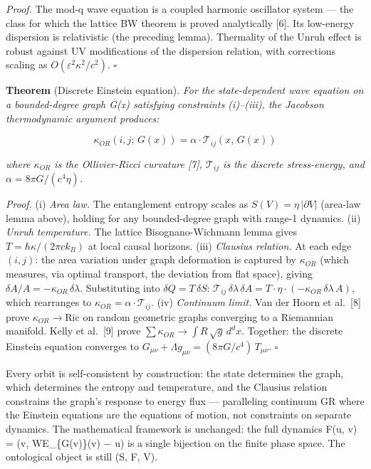 \documentclass[
]{article}
\begin{document}
\emph{Proof.} The mod-q wave equation is a coupled harmonic oscillator
system --- the class for which the lattice BW theorem is proved
analytically {[}6{]}. Its low-energy dispersion is relativistic (the
preceding lemma). Thermality of the Unruh effect is robust against UV
modifications of the dispersion relation, with corrections scaling as
\(O(\varepsilon^2\kappa^2/c^2)\). \(\square\)

\textbf{Theorem} (Discrete Einstein equation). \emph{For the
state-dependent wave equation on a bounded-degree graph G(x) satisfying
constraints (i)--(iii), the Jacobson thermodynamic argument produces:}

\[\kappa_{OR}(i, j;\, G(x)) = \alpha \cdot \mathcal{T}_{ij}(x,\, G(x))\]

\emph{where \(\kappa_{OR}\) is the Ollivier-Ricci curvature {[}7{]},
\(\mathcal{T}_{ij}\) is the discrete stress-energy, and
\(\alpha = 8\pi G/(c^4 \eta)\).}

\emph{Proof.} (i) \emph{Area law.} The entanglement entropy scales as
\(S(V) = \eta\,|\partial V|\) (area-law lemma above), holding for any
bounded-degree graph with range-1 dynamics. (ii) \emph{Unruh
temperature.} The lattice Bisognano-Wichmann lemma gives
\(T = \hbar\kappa/(2\pi c k_B)\) at local causal horizons. (iii)
\emph{Clausius relation.} At each edge \((i,j)\): the area variation
under graph deformation is captured by \(\kappa_{OR}\) (which measures,
via optimal transport, the deviation from flat space), giving
\(\delta A / A = -\kappa_{OR}\,\delta\lambda\). Substituting into
\(\delta Q = T\,\delta S\):
\(\mathcal{T}_{ij}\,\delta\lambda\,\delta A = T \cdot \eta \cdot (-\kappa_{OR}\,\delta\lambda\,A)\),
which rearranges to \(\kappa_{OR} = \alpha \cdot \mathcal{T}_{ij}\).
(iv) \emph{Continuum limit.} Van der Hoorn et al.~{[}8{]} prove
\(\kappa_{OR} \to \mathrm{Ric}\) on random geometric graphs converging
to a Riemannian manifold. Kelly et al.~{[}9{]} prove
\(\sum \kappa_{OR} \to \int R\,\sqrt{g}\,d^dx\). Together: the discrete
Einstein equation converges to
\(G_{\mu\nu} + \Lambda g_{\mu\nu} = (8\pi G/c^4)\,T_{\mu\nu}\).
\(\square\)

Every orbit is self-consistent by construction: the state determines the
graph, which determines the entropy and temperature, and the Clausius
relation constrains the graph's response to energy flux --- paralleling
continuum GR where the Einstein equations are the equations of motion,
not constraints on separate dynamics. The mathematical framework is
unchanged: the full dynamics F(u, v) = (v, WE\_\{G(v)\}(v) − u) is a
single bijection on the finite phase space. The ontological object is
still (S, F, V).
\end{document}
